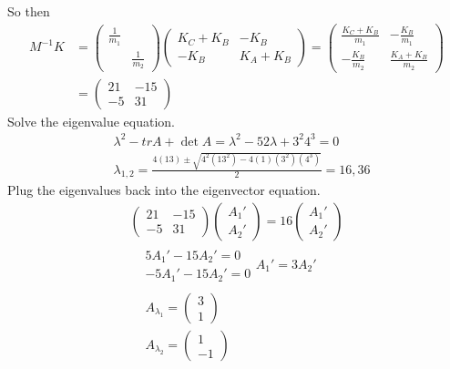 \documentclass[twoside,10pt]{amsart}
\begin{document}
So then
\[
\begin{aligned}
  M^{-1} K &  = \left( \begin{matrix} \frac{1}{m_1} & \\ & \frac{1}{m_2} \end{matrix} \right)  \left( \begin{matrix} K_C + K_B & -K_B \\ -K_B & K_A + K_B \end{matrix} \right) =  \left( \begin{matrix} \frac{K_C + K_B}{m_1} & -\frac{K_B}{m_1} \\ -\frac{K_B}{m_2} & \frac{K_A + K_B}{m_2} \end{matrix} \right)  \\
  & = \left( \begin{matrix} 21 & -15 \\ -5 & 31 \end{matrix} \right)
\end{aligned}
\]
Solve the eigenvalue equation.  
\[
\begin{aligned}
& \lambda^2 - trA + \det{A} = \lambda^2 - 52 \lambda + 3^2 4^3 = 0 \\
& \lambda_{1,2} = \frac{ 4(13) \pm \sqrt{ 4^2 (13^2) - 4 (1)(3^2)(4^3) } }{ 2 } = 16,36 
\end{aligned}
\]
Plug the eigenvalues back into the eigenvector equation.
\[
\begin{gathered}
  \left( \begin{matrix} 21 & -15 \\ -5 & 31 \end{matrix} \right) \left( \begin{matrix} A_1' \\ A_2' \end{matrix} \right) = 16 \left( \begin{matrix} A_1' \\ A_2' \end{matrix} \right) \\
  \begin{aligned}
    & 5A_1' - 15 A_2' = 0 \\
    & -5A_1' -15 A_2' = 0 
  \end{aligned}  
  A_1' = 3A_2' \\
\begin{aligned}
  & A_{\lambda_1} = \left( \begin{matrix} 3 \\ 1 \end{matrix} \right)  \\
  & A_{\lambda_2} = \left( \begin{matrix} 1 \\ -1 \end{matrix} \right) 
\end{aligned}
\end{gathered}
\]
\end{document}
